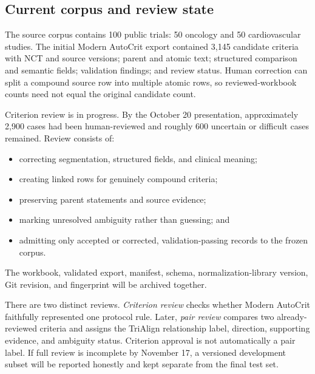 \documentclass[10pt]{article}
\begin{document}
\subsection{Current corpus and review state}
The source corpus contains 100 public trials: 50 oncology and 50 cardiovascular studies. The initial Modern AutoCrit export contained 3,145 candidate criteria with NCT and source versions; parent and atomic text; structured comparison and semantic fields; validation findings; and review status. Human correction can split a compound source row into multiple atomic rows, so reviewed-workbook counts need not equal the original candidate count.

Criterion review is in progress. By the October 20 presentation, approximately 2,900 cases had been human-reviewed and roughly 600 uncertain or difficult cases remained. Review consists of:
\begin{itemize}
\item correcting segmentation, structured fields, and clinical meaning;
\item creating linked rows for genuinely compound criteria;
\item preserving parent statements and source evidence;
\item marking unresolved ambiguity rather than guessing; and
\item admitting only accepted or corrected, validation-passing records to the frozen corpus.
\end{itemize}
The workbook, validated export, manifest, schema, normalization-library version, Git revision, and fingerprint will be archived together.

There are two distinct reviews. \emph{Criterion review} checks whether Modern AutoCrit faithfully represented one protocol rule. Later, \emph{pair review} compares two already-reviewed criteria and assigns the TriAlign relationship label, direction, supporting evidence, and ambiguity status. Criterion approval is not automatically a pair label. If full review is incomplete by November 17, a versioned development subset will be reported honestly and kept separate from the final test set.
\end{document}
